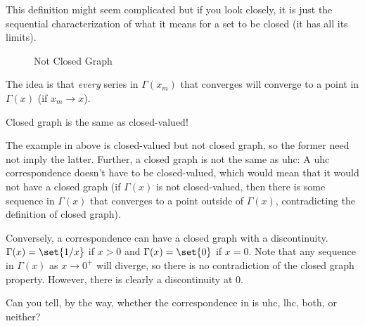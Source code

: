 \documentclass{article}
\begin{document}
This definition might seem complicated but if you look closely, it is just the sequential characterization of what it means for a set to be closed (it has all its limits).
\begin{figure}[H]
  \centering
  \caption{Not Closed Graph}
  \label{fig:not_closed_graph}
\end{figure}

The idea is that \textit{every} series in $\Gamma(x_m)$ that converges will converge to a point in $\Gamma(x)$ (if $x_m \to x$).
\begin{remark}
  Closed graph is  the same as closed-valued!

  The example in  above is closed-valued but not closed graph, so the former need not imply the latter. Further, a closed graph is not the same as uhc: A uhc correspondence doesn't have to be closed-valued, which would mean that it would not have a closed graph (if $\Gamma(x)$ is not closed-valued, then there is some sequence in $\Gamma(x)$ that converges to a point outside of $\Gamma(x)$, contradicting the definition of closed graph).

  Conversely, a correspondence can have a closed graph with a discontinuity. $\Gamma(x) = \set{1/x}$ if $x > 0$ and $\Gamma(x) = \set{0}$ if $x = 0$. Note that any sequence in $\Gamma(x)$ as $x \to 0^+$ will diverge, so there is no contradiction of the closed graph property. However, there is clearly a discontinuity at $0$.


  Can you tell, by the way, whether the correspondence in  is uhc, lhc, both, or neither?
\end{remark}
\end{document}
